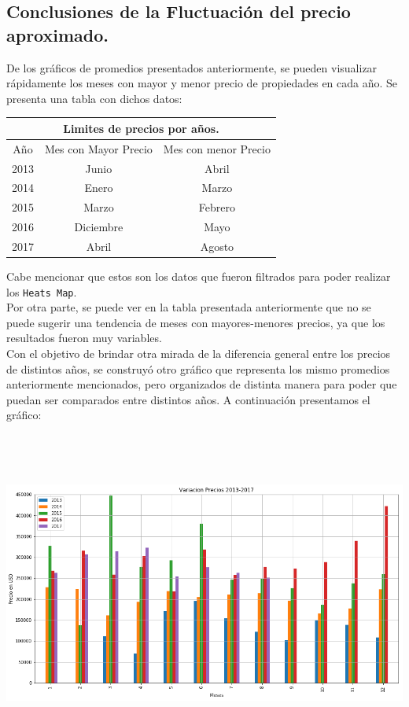 \documentclass[a4paper, 10pt]{article}
\def\code#1{\texttt{#1}}
\newcommand\tab[1][0.5cm]{\hspace*{#1}}
\begin{document}
      	\subsection{Conclusiones de la Fluctuación del precio aproximado.}
			De los gráficos de promedios presentados anteriormente, se pueden visualizar rápidamente los meses con mayor y menor
			precio de propiedades en cada año. Se presenta una tabla con dichos datos:
        		\begin{center}
          		\begin{tabular}{ |c|c|c| }
            			\hline
		        		\multicolumn{3}{|c|}{Limites de precios por años.}\\
        		   		\hline
        		   		\hline
        		   		Año & Mes con Mayor Precio & Mes con menor Precio \\
        		   		\hline
        		   		2013 & Junio & Abril \\
        		   		2014 & Enero & Marzo \\
        		   		2015 & Marzo & Febrero \\
        		   		2016 & Diciembre & Mayo \\
        		   		2017 & Abril & Agosto \\
		            \hline
		        \end{tabular}
		    \end{center}
			\tab Cabe mencionar que estos son los datos que fueron filtrados para poder realizar los \code{Heats Map}. \\
	         \tab Por otra parte, se puede ver en la tabla presentada anteriormente que no se puede sugerir una tendencia de meses
	         con mayores-menores precios, ya que los resultados fueron muy variables. \\
	         \tab Con el objetivo de brindar otra mirada de la diferencia general entre los precios de distintos años, se construyó
	         otro gráfico que representa los mismo promedios anteriormente mencionados, pero organizados de distinta manera para
	         poder que puedan ser comparados entre distintos años. A continuación presentamos el gráfico:
			\begin{center}
              	\includegraphics[width=6in, height=4.2in]{images/comparacionAnual}
        		\end{center}
\end{document}
